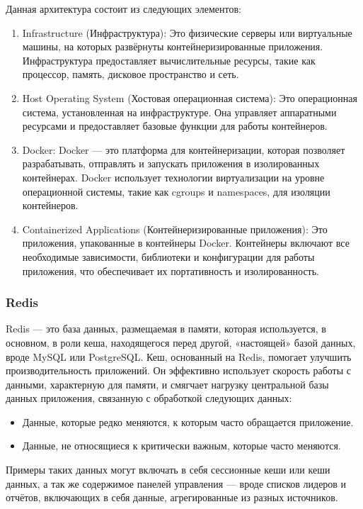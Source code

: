 Данная архитектура состоит из следующих элементов:
\begin{enumerate}
	\item Infrastructure (Инфраструктура): Это физические серверы или виртуальные машины, на которых развёрнуты контейнеризированные приложения. Инфраструктура предоставляет вычислительные ресурсы, такие как процессор, память, дисковое пространство и сеть.
	\item Host Operating System (Хостовая операционная система): Это операционная система, установленная на инфраструктуре. Она управляет аппаратными ресурсами и предоставляет базовые функции для работы контейнеров.
	\item Docker: Docker — это платформа для контейнеризации, которая позволяет разрабатывать, отправлять и запускать приложения в изолированных контейнерах. Docker использует технологии виртуализации на уровне операционной системы, такие как cgroups и namespaces, для изоляции контейнеров.
	\item Containerized Applications (Контейнеризированные приложения): Это приложения, упакованные в контейнеры Docker. Контейнеры включают все необходимые зависимости, библиотеки и конфигурации для работы приложения, что обеспечивает их портативность и изолированность.
\end{enumerate}

\subsubsection{Redis}

Redis — это база данных, размещаемая в памяти, которая используется, в основном, в роли кеша, находящегося перед другой, «настоящей» базой данных, вроде MySQL или PostgreSQL. Кеш, основанный на Redis, помогает улучшить производительность приложений. Он эффективно использует скорость работы с данными, характерную для памяти, и смягчает нагрузку центральной базы данных приложения, связанную с обработкой следующих данных:
\begin{itemize}
	\item Данные, которые редко меняются, к которым часто обращается приложение.
	\item Данные, не относящиеся к критически важным, которые часто меняются.
\end{itemize}

Примеры таких данных могут включать в себя сессионные кеши или кеши данных, а так же содержимое панелей управления — вроде списков лидеров и отчётов, включающих в себя данные, агрегированные из разных источников.

